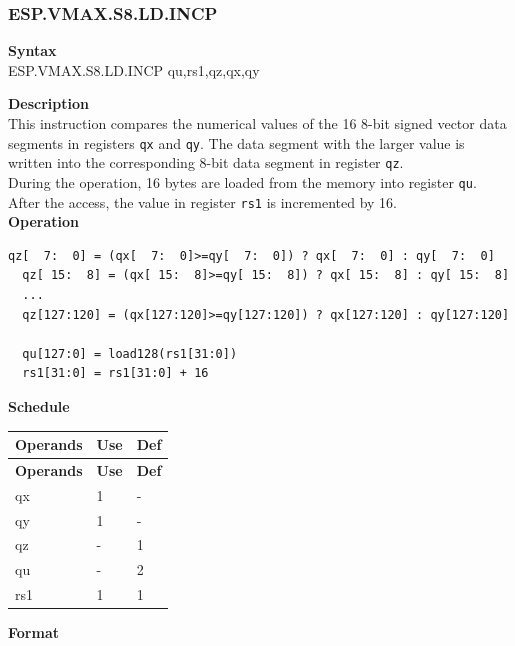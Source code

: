 \newpage
\subsubsection{ESP.VMAX.S8.LD.INCP}\label{instruction:ESPVMAXS8LDINCP}
\textbf{Syntax}\\
ESP.VMAX.S8.LD.INCP qu,rs1,qz,qx,qy

\textbf{Description}\\
This instruction compares the numerical values of the 16 8-bit signed vector data segments in registers \lstinline{qx} and \lstinline{qy}. The data segment with the larger value is written into the corresponding 8-bit data segment in register \lstinline{qz}.\\During the operation, 16 bytes are loaded from the memory into register \lstinline{qu}. After the access, the value in register \lstinline{rs1} is incremented by 16.\\
\textbf{Operation}
\begin{lstlisting}[escapeinside=`?]
  qz[  7:  0] = (qx[  7:  0]>=qy[  7:  0]) ? qx[  7:  0] : qy[  7:  0]
  qz[ 15:  8] = (qx[ 15:  8]>=qy[ 15:  8]) ? qx[ 15:  8] : qy[ 15:  8]
  ...
  qz[127:120] = (qx[127:120]>=qy[127:120]) ? qx[127:120] : qy[127:120]

  qu[127:0] = load128(rs1[31:0])
  rs1[31:0] = rs1[31:0] + 16
\end{lstlisting}


\textbf{Schedule}\\
\begin{longtable}[c]{|l|l|l|}
    \hline
    \rowcolor{lightgray}
    \textbf{Operands} & \textbf{Use} & \textbf{Def} \\\hline
    \endfirsthead
    \hline
    \rowcolor{lightgray}
     \textbf{Operands} & \textbf{Use} & \textbf{Def} \\\hline
    \endhead
    \hline
    \endfoot

    qx & 1 & - \\\hline
  qy & 1 & - \\\hline
     qz & - & 1 \\\hline
     qu & - & 2 \\\hline
     rs1 & 1 & 1

\end{longtable}

\textbf{Format}\\

